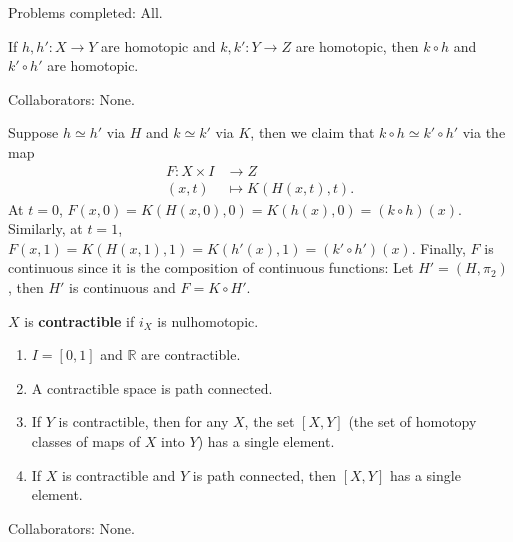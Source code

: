\documentclass[10pt]{report}
\begin{document}

{\color{blue}Problems completed: All.}

\begin{exer}[\S 51 \#1]
If $h,h':X\to Y$ are homotopic and $k,k':Y\to Z$ are homotopic, then $k \circ h$ and $k' \circ h'$ are homotopic.
\end{exer}
{\color{blue}Collaborators: None.}

Suppose $h \simeq h'$ via  $H$ and $k \simeq k'$ via $K$, then we claim that $k \circ h \simeq k'\circ h'$ via the map
\begin{align*}
	F: X \times I &\to Z\\
	(x,t)&\mapsto K(H(x,t),t).
\end{align*}
At $t=0$, $F(x,0) = K(H(x,0),0) = K(h(x),0) = (k\circ h)(x)$. Similarly, at $t=1$, $F(x,1)=K(H(x,1),1)=K(h'(x),1) = (k'\circ h')(x)$. Finally, $F$ is continuous since it is the composition of continuous functions: Let $H' = (H, \pi_2)$, then $H'$ is continuous and $F = K \circ H'$.

\pagebreak
\begin{exer}[\S 51 \#3]
	$X$ is \textbf{contractible} if $i_{X}$ is nulhomotopic.
	\begin{enumerate}
		\item $I=[0,1]$ and $\mathbb{R}$ are contractible.
		\item A contractible space is path connected.
		\item If $Y$ is contractible, then for any $X$, the set $[X,Y]$ (the set of homotopy classes of maps of $X$ into $Y$) has a single element.
		\item If $X$ is contractible and $Y$ is path connected, then $[X,Y]$ has a single element.
	\end{enumerate}
\end{exer}
{\color{blue}Collaborators: None.}
\end{document}
